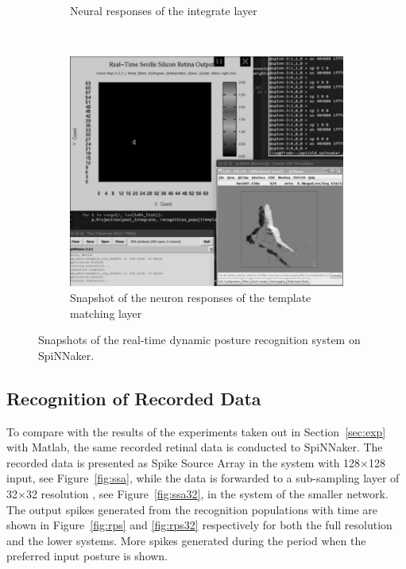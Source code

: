 \documentclass[journal]{journal}
\begin{document}
\begin{figure}
\begin{subfigure}[t]{0.24\textwidth}
		\caption{Neural responses of the integrate layer~\cite{video2}}
	    \label{fig:live2}
	\end{subfigure}
	\\
	\begin{subfigure}[t]{0.48\textwidth}
		\includegraphics[width=\textwidth]{pics/live.png}
		\caption{Snapshot of the neuron responses of the template matching layer~\cite{video3}}
	    \label{fig:live3}
	\end{subfigure}	

\caption{Snapshots of the real-time dynamic posture recognition system on SpiNNaker.
}
\label{fig:live}
\end{figure}

\subsection{Recognition of Recorded Data}
To compare with the results of the experiments taken out in Section~\ref{sec:exp} with Matlab, the same recorded retinal data is conducted to SpiNNaker. 
The recorded data is presented as Spike Source Array in the system with 128$\times$128 input, see Figure~\ref{fig:ssa}, while the data is forwarded to a sub-sampling layer of 32$\times$32 resolution 
, see Figure~\ref{fig:ssa32}, in the system of the smaller network. 
The output spikes generated from the recognition populations with time are shown in Figure~\ref{fig:rps} and \ref{fig:rps32} respectively for both the full resolution and the lower systems. 
More spikes generated during the period when the preferred input posture is shown. 
\end{document}
